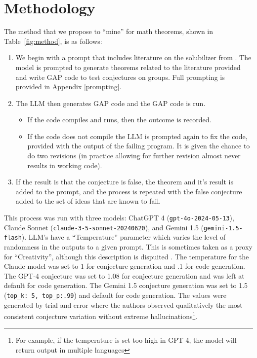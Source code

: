\documentclass{article}
\begin{document}
\section{Methodology} 
The method that we propose to ``mine'' for math theorems, shown in Table~\ref{fig:method},  is as follows:
\begin{enumerate}
    \item We begin with a prompt that includes literature on the solubilizer from \cite{akbari2018nonsolvable, akbari2020solubility, akbari2022solubilizer, SolvMinimalSimple,haireuven2013nonsolvable, lucchini2023solubilizers, mousavi2023solubilizer}. The model is prompted to generate theorems related to the literature provided and write GAP code to test conjectures on groups. Full prompting is provided in Appendix \ref{prompting}. 
    \item The LLM then generates GAP code and the GAP code is run. \begin{itemize}
        \item[\Checkmark] If the code compiles and runs, then the outcome is recorded.
        \item[\XSolidBrush] If the code does not compile the LLM is prompted again to fix the code, provided with the output of the failing program. It is given the chance to do two revisions (in practice allowing for further revision almost never results in working code).
    \end{itemize}
    \item If the result is that the conjecture is false, the theorem and it's result is added to the prompt, and the process is repeated with the false conjecture added to the set of ideas that are known to fail. 
\end{enumerate}

This process was run with three models: ChatGPT 4 (\verb|gpt-4o-2024-05-13|), Claude Sonnet (\verb|claude-3-5-sonnet-20240620|), and Gemini 1.5 (\verb|gemini-1.5-flash|). LLM's have a ``Temperature'' parameter which varies the level of randomness in the outputs to a given prompt. This is sometimes taken as a proxy for ``Creativity'', although this description is dispuited \cite{peeperkorn}. The temperature for the Claude model was set to 1 for conjecture generation and .1 for code generation. The GPT-4 conjecture was set to 1.08 for conjecture generation and was left at default for code generation. The Gemini 1.5 conjecture generation was set to 1.5 (\verb|top_k: 5, top_p:.99|) and default for code generation. The values were generated by trial and error where the authors observed qualitatively the most consistent conjecture variation without extreme hallucinations\footnote{For example, if the temperature is set too high in GPT-4, the model will return output in multiple languages}.
\end{document}
